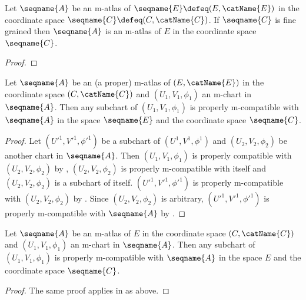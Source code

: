 \documentclass{article}
\begin{document}
\begin{lemma}
\label{lem:M-CompatATL}
Let $\seqname{A}$ be an m-atlas of $\seqname{E} \defeq (E, \catName{E})$
in the coordinate space $\seqname{C} \defeq (C,\catName{C})$. If
$\seqname{C}$ is fine grained then $\seqname{A}$ is an m-atlas of $E$ in
the coordinate space $\seqname{C}$.

\begin{proof}
\end{proof}
\end{lemma}

\begin{lemma}
\label{lem:M-CompatsubATL}
Let $\seqname{A}$ be an (a proper) m-atlas of $(E, \catName{E})$ in the
coordinate space $(C,\catName{C})$ and $(U_1, V_1, \phi_1)$ an m-chart
in $\seqname{A}$. Then any subchart of $(U_1, V_1, \phi_1)$ is
properly m-compatible with $\seqname{A}$ in the space $\seqname{E}$
and the coordinate space $\seqname{C}$.

\begin{proof}
Let $(U'^1, V'^1, \phi'^1)$ be a subchart of $(U^1, V^1, \phi^1)$ and
$(U_2, V_2, \phi_2)$ be another chart in $\seqname{A}$.  Then
$(U_1, V_1, \phi_1)$ is properly compatible with $(U_2, V_2, \phi_2)$
by , $(U_2, V_2, \phi_2)$ is properly
m-compatible with itself and $(U_2, V_2, \phi_2)$ is a subchart of
itself. $(U'^1, V'^1, \phi'^1)$ is properly m-compatible with
$(U_2, V_2, \phi_2)$ by . Since
$(U_2, V_2, \phi_2)$ is arbitrary, $(U'^1, V'^1, \phi'^1)$ is properly
m-compatible with $\seqname{A}$ by .
\end{proof}

Let $\seqname{A}$ be an m-atlas of $E$ in the coordinate space
$(C,\catName{C})$ and $(U_1, V_1, \phi_1)$ an m-chart in $\seqname{A}$.
Then any subchart of $(U_1, V_1, \phi_1)$ is properly m-compatible with
$\seqname{A}$ in the space $E$ and the coordinate space $\seqname{C}$.

\begin{proof}
The same proof applies in as above.
\end{proof}
\end{lemma}
\end{document}
